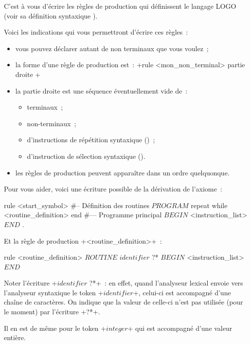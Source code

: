 C'est à vous d'écrire les règles de production qui définissent le langage LOGO (voir sa définition syntaxique ).

Voici les indications qui vous permettront d'écrire ces règles~:
\begin{itemize}
  \item vous pouvez déclarer autant de non terminaux que vous voulez~;
  \item la forme d'une règle de production est~: \ggsq+rule <mon_non_terminal> { partie droite }+
  \item la partie droite est une séquence éventuellement vide de~:
  \begin{itemize}
    \item terminaux~;
    \item non-terminaux~;
    \item d'instructions de répétition syntaxique ()~;
    \item d'instruction de sélection syntaxique ().
  \end{itemize}
  \item les règles de production peuvent apparaître dans un ordre quelquonque.
\end{itemize}

Pour vous aider, voici une écriture possible de la dérivation de l'axiome~:

\begin{galgas4}
rule <start_symbol> {
#-- Définition des routines
  $PROGRAM$
  repeat
  while
    <routine_definition>
  end
#--- Programme principal
  $BEGIN$
  <instruction_list>
  $END$
  $.$
}
\end{galgas4}

Et la règle de production \ggsq+<routine_definition>+~:

\begin{galgas4}
rule <routine_definition> {
  $ROUTINE$
  $identifier$ ?*
  $BEGIN$
  <instruction_list>
  $END$
}
\end{galgas4}

Noter l’écriture \ggsq+$identifier$ ?*+~: en effet, quand l’analyseur lexical envoie vers l’analyseur syntaxique le token \ggsq+$identifier$+, celui-ci est accompagné d’une chaîne de caractères. On indique que la valeur de celle-ci n’est pas utilisée (pour le moment) par l’écriture \ggsq+?*+.

Il en est de même pour le token \ggsq+$integer$+ qui est accompagné d’une valeur entière.

